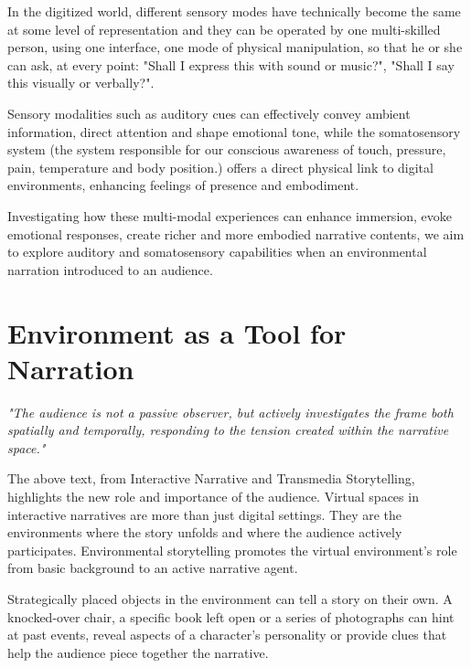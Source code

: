         In the digitized world, different sensory modes have technically become the same at some level of representation and they can be operated by one multi-skilled person, using one interface, one mode of physical manipulation, so that he or she can ask, at every point: "Shall I express this with sound or music?", "Shall I say this visually or verbally?"\cite{Multimodal_Discourse}.\par

        Sensory modalities such as auditory cues can effectively convey ambient information, direct attention and shape emotional tone, while the somatosensory system (the system responsible for our conscious awareness of touch, pressure, pain, temperature and body position\cite{Somatic_Sensory}.) offers a direct physical link to digital environments, enhancing feelings of presence and embodiment.\par

        Investigating how these multi-modal experiences can enhance immersion, evoke emotional responses, create richer and more embodied narrative contents, we aim to explore auditory and somatosensory capabilities when an environmental narration introduced to an audience.\par
    \section{Environment as a Tool for Narration} 
        \emph{"The audience is not a passive observer, but actively investigates the frame both spatially and temporally, responding to the tension created within the narrative space."\cite{Transmedia_Storytelling}}

        The above text, from Interactive Narrative and Transmedia Storytelling, highlights the new role and importance of the audience. Virtual spaces in interactive narratives are more than just digital settings. They are the environments where the story unfolds and where the audience actively participates. Environmental storytelling promotes the virtual environment's role from basic background to an active narrative agent.\par

        Strategically placed objects in the environment can tell a story on their own. A knocked-over chair, a specific book left open or a series of photographs can hint at past events, reveal aspects of a character's personality or provide clues that help the audience piece together the narrative\cite{Environmental_Storytelling_Blogpost}.\par 

